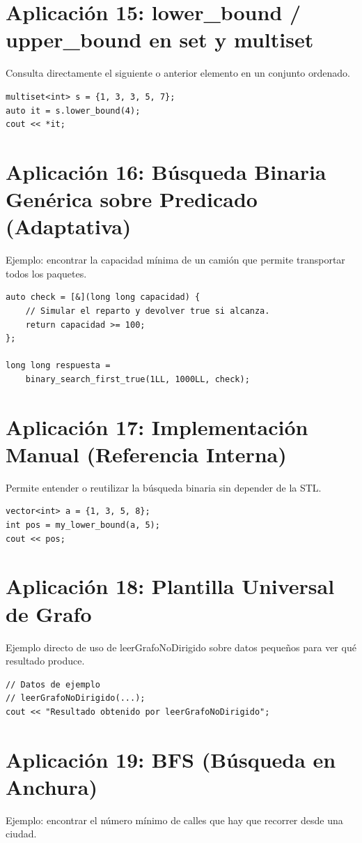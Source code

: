\documentclass[10pt,twocolumn,letterpaper]{report}
\begin{document}
\section{Aplicación 15: lower\_bound / upper\_bound en set y multiset}
Consulta directamente el siguiente o anterior elemento en un conjunto ordenado.

\begin{lstlisting}
multiset<int> s = {1, 3, 3, 5, 7};
auto it = s.lower_bound(4);
cout << *it;
\end{lstlisting}

\section{Aplicación 16: Búsqueda Binaria Genérica sobre Predicado (Adaptativa)}
Ejemplo: encontrar la capacidad mínima de un camión que permite transportar todos los paquetes.

\begin{lstlisting}
auto check = [&](long long capacidad) {
    // Simular el reparto y devolver true si alcanza.
    return capacidad >= 100;
};

long long respuesta =
    binary_search_first_true(1LL, 1000LL, check);
\end{lstlisting}

\section{Aplicación 17: Implementación Manual (Referencia Interna)}
Permite entender o reutilizar la búsqueda binaria sin depender de la STL.

\begin{lstlisting}
vector<int> a = {1, 3, 5, 8};
int pos = my_lower_bound(a, 5);
cout << pos;
\end{lstlisting}

\section{Aplicación 18: Plantilla Universal de Grafo}
Ejemplo directo de uso de leerGrafoNoDirigido sobre datos pequeños para ver qué resultado produce.

\begin{lstlisting}
// Datos de ejemplo
// leerGrafoNoDirigido(...);
cout << "Resultado obtenido por leerGrafoNoDirigido";
\end{lstlisting}

\section{Aplicación 19: BFS (Búsqueda en Anchura)}
Ejemplo: encontrar el número mínimo de calles que hay que recorrer desde una ciudad.
\end{document}
